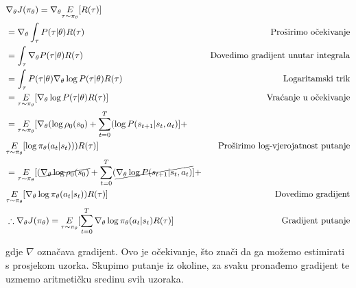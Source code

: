 \documentclass[times,utf8,diplomski]{fer}
\begin{document}
\begin{align*}
	\label{izvod}
	 & \nabla_{\theta} J(\pi_{\theta}) = \nabla_{\theta} \underset{\tau \sim \pi_{\theta}}E[{R(\tau)}]                                                           &                                            \\
	 & = \nabla_{\theta} \int_{\tau} P(\tau|\theta) R(\tau)                                                                                                      & \text{Proširimo očekivanje}                \\
	 & = \int_{\tau} \nabla_{\theta} P(\tau|\theta) R(\tau)                                                                                                      & \text{Dovedimo gradijent unutar integrala} \\
	 & = \int_{\tau} P(\tau|\theta) \nabla_{\theta} \log P(\tau|\theta) R(\tau)                                                                                  & \text{Logaritamski trik}                   \\
	 & = \underset{\tau \sim \pi_{\theta}}E[{\nabla_{\theta} \log P(\tau|\theta) R(\tau)}]                                                                       & \text{Vraćanje u očekivanje}               \\
	 & = \underset{\tau \sim \pi_{\theta}}E[{\nabla_{\theta} (\log \rho_0 (s_0) + \sum_{t=0}^{T} ( \log P(s_{t+1}|s_t, a_t)}]  +                                                                              \\
	 & \underset{\tau \sim \pi_{\theta}}E[{\log \pi_{\theta}(a_t |s_t))) R(\tau)}]                                                                               & \text{Proširimo log-vjerojatnost putanje}  \\
	 & = \underset{\tau \sim \pi_{\theta}}E[{( \cancel{\nabla_{\theta}\log \rho_0 (s_0)} + \sum_{t=0}^{T} ( \cancel{\nabla_{\theta}\log P(s_{t+1}|s_t, a_t)}}] +                                              \\
	 & \underset{\tau \sim \pi_{\theta}}E[{\nabla_{\theta}\log \pi_{\theta}(a_t |s_t)) R(\tau)}]                                                                 & \text{Dovedimo gradijent}                  \\
	 & \therefore \nabla_{\theta} J(\pi_{\theta}) = \underset{\tau \sim \pi_{\theta}}E[{\sum_{t=0}^{T} \nabla_{\theta} \log \pi_{\theta}(a_t |s_t) R(\tau)}]     & \text{Gradijent putanje}
\end{align*}

\noindent gdje ${\nabla}$ označava gradijent. Ovo je očekivanje, što znači da ga možemo estimirati s prosjekom uzorka. Skupimo putanje iz okoline, za svaku pronađemo gradijent te uzmemo aritmetičku sredinu svih uzoraka.
\end{document}

